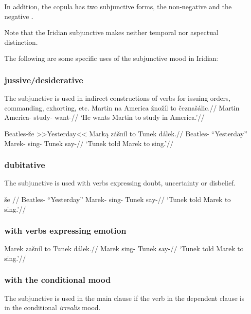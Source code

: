 In addition, the copula has two subjunctive forms, the non-negative  and the negative .

Note that the Iridian subjunctive makes neither temporal nor aspectual distinction.

\par The following are some specific uses of the subjunctive mood in Iridian:
\subsubsection{jussive/desiderative}
\par The subjunctive is used in indirect constructions of verbs for issuing orders, commanding, exhorting, etc.
\pex
\begingl
\gla Martin na America \v{z}no\v{z}\'il to \v{c}ezna\v{s}\'alic.//
\glb Martin  America- study-  want-//
\glft `He wants Martin to study in America.'//
\endgl
\xe

\pex
\begingl
\gla Beatles-\v{z}e >>Yesterday<< Mark\k{a} z\'a\v{s}n\'il to Tunek dálek.//
\glb Beatles- ``Yesterday'' Marek- sing-  Tunek say-//
\glft `Tunek told Marek to sing.'//
\endgl
\xe

\subsubsection{dubitative}
\par The subjunctive is used with verbs expressing doubt, uncertainty or disbelief.

\pex
\begingl
\gla \v{s}e //
\glb Beatles- ``Yesterday'' Marek- sing-  Tunek say-//
\glft `Tunek told Marek to sing.'//
\endgl
\xe

\subsubsection{with verbs expressing emotion}

\pex
\begingl
\gla Marek za\v{s}n\'il to Tunek dálek.//
\glb Marek sing-  Tunek say-//
\glft `Tunek told Marek to sing.'//
\endgl
\xe


\subsubsection{with the conditional mood}
\par The subjunctive is used in the main clause if the verb in the dependent clause is in the conditional \textit{irrealis} mood.

